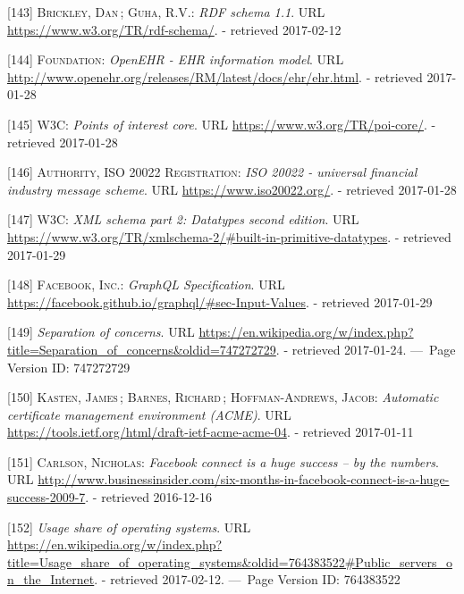 \documentclass[12pt,english,a4paper,titlepage,cleardoublepage=empty,dottedtoc]{report}
\begin{document}
\hypertarget{ref-web_w3c-tr_rdf-schemas}{}
{[}143{]} \textsc{Brickley, Dan}\,; \textsc{Guha, R.V.}: \emph{RDF
schema 1.1}. URL \url{https://www.w3.org/TR/rdf-schema/}. - retrieved
2017-02-12

\hypertarget{ref-web_spec_data-schemas_ehr}{}
{[}144{]} \textsc{Foundation}: \emph{OpenEHR - EHR information model}.
URL \url{http://www.openehr.org/releases/RM/latest/docs/ehr/ehr.html}. -
retrieved 2017-01-28

\hypertarget{ref-web_spec_data-schemas_poi}{}
{[}145{]} \textsc{W3C}: \emph{Points of interest core}. URL
\url{https://www.w3.org/TR/poi-core/}. - retrieved 2017-01-28

\hypertarget{ref-web_spec_data-schemas_bank-transfer}{}
{[}146{]} \textsc{Authority, ISO 20022 Registration}: \emph{ISO 20022 -
universal financial industry message scheme}. URL
\url{https://www.iso20022.org/}. - retrieved 2017-01-28

\hypertarget{ref-web_spec_xml_types}{}
{[}147{]} \textsc{W3C}: \emph{XML schema part 2: Datatypes second
edition}. URL
\url{https://www.w3.org/TR/xmlschema-2/\#built-in-primitive-datatypes}.
- retrieved 2017-01-29

\hypertarget{ref-web_spec_graphql_types}{}
{[}148{]} \textsc{Facebook, Inc.}: \emph{GraphQL Specification}. URL
\url{https://facebook.github.io/graphql/\#sec-Input-Values}. - retrieved
2017-01-29

\hypertarget{ref-web_2016_wikipedia_separation-of-concerns}{}
{[}149{]} \emph{Separation of concerns}. URL
\url{https://en.wikipedia.org/w/index.php?title=Separation_of_concerns\&oldid=747272729}.
- retrieved 2017-01-24. ---~Page Version ID: 747272729

\hypertarget{ref-web_spec_acme}{}
{[}150{]} \textsc{Kasten, James}\,; \textsc{Barnes, Richard}\,;
\textsc{Hoffman-Andrews, Jacob}: \emph{Automatic certificate management
environment (ACME)}. URL
\url{https://tools.ietf.org/html/draft-ietf-acme-acme-04}. - retrieved
2017-01-11

\hypertarget{ref-web_2009-success-of-facebook-connect}{}
{[}151{]} \textsc{Carlson, Nicholas}: \emph{Facebook connect is a huge
success -- by the numbers}. URL
\url{http://www.businessinsider.com/six-months-in-facebook-connect-is-a-huge-success-2009-7}.
- retrieved 2016-12-16

\hypertarget{ref-web_2017_wikipedia_os-market-share}{}
{[}152{]} \emph{Usage share of operating systems}. URL
\url{https://en.wikipedia.org/w/index.php?title=Usage_share_of_operating_systems\&oldid=764383522\#Public_servers_on_the_Internet}.
- retrieved 2017-02-12. ---~Page Version ID: 764383522
\end{document}
